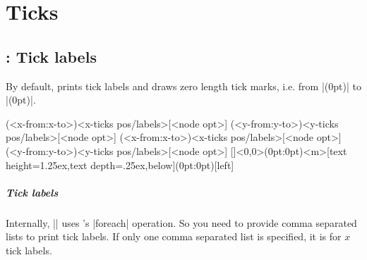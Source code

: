 \begin{tzcode}{.3}
\end{tzcode}




\chapter{Ticks}
\label{c:ticks}


\section{\protect\cmd{\tzticks}: Tick labels}
\label{s:tzticks}

By default, \icmd{\tzticks} prints tick labels and draws zero length tick marks, i.e. from |(0pt)| to |(0pt)|.

\begin{tzdef}
\tzticks(<x-from:x-to>){<x-ticks pos/labels>}[<node opt>]
        (<y-from:y-to>){<y-ticks pos/labels>}[<node opt>]
        (<x-from:x-to>){<x-ticks pos/labels>}[<node opt>]
        (<y-from:y-to>){<y-ticks pos/labels>}[<node opt>]
  []<0,0>(0pt:0pt){<m>}[text height=1.25ex,text depth=.25ex,below](0pt:0pt){}[left]
\end{tzdef}

\paragraph{Tick labels}
Internally, |\tzticks| uses \Tikz's |foreach| operation.
So you need to provide comma separated lists to print tick labels.
If only one comma separated list is specified, it is for $x$ tick labels.

\begin{tzcode}{.3}
{}
\end{tzcode}

